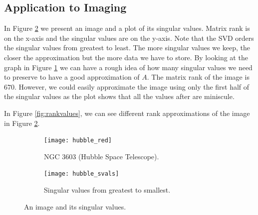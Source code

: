 \subsection*{Application to Imaging}

In Figure \ref{fig:hubble} we present an image and a plot of its singular values.
Matrix rank is on the x-axis and the singular values are on the y-axis.
Note that the SVD orders the singular values from greatest to least.
The more singular values we keep, the closer the approximation but the more data we have to store.
By looking at the graph in Figure \ref{fig:svals_plot} we can have a rough idea of how many singular values we need to preserve to have a good approximation of $A$.
The matrix rank of the image is $670$.
However, we could easily approximate the image using only the first half of the singular values as the plot shows that all the values after are miniscule.



In Figure \ref{fig:rankvalues}, we can see different rank approximations of the image in Figure \ref{fig:hubble}.

\begin{figure}
\centering
\begin{subfigure}[b]{.49\textwidth}
\centering
\texttt{[image: hubble\_red]}
\caption{NGC 3603 (Hubble Space Telescope).}
\end{subfigure}
\begin{subfigure}[b]{.49\textwidth}
\centering
\texttt{[image: hubble\_svals]}
\caption{Singular values from greatest to smallest.}
\label{fig:svals_plot}
\end{subfigure}
\caption{An image and its singular values.}
\label{fig:hubble}
\end{figure}

